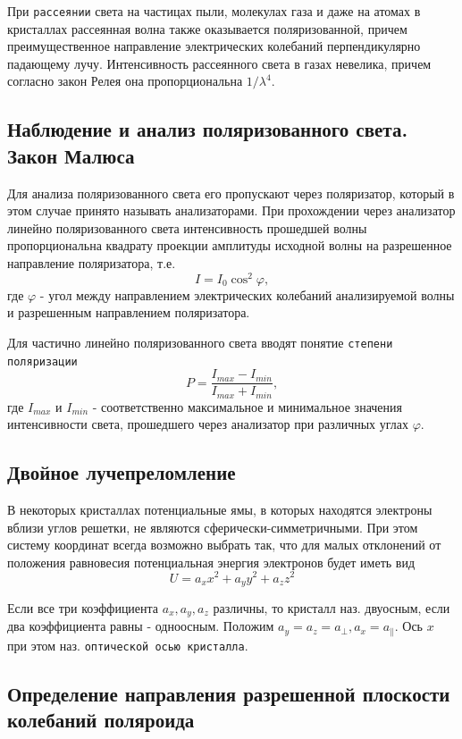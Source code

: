 \documentclass[a4paper,12pt]{article}
\begin{document}
При \texttt{рассеянии} света на частицах пыли, молекулах газа и даже на атомах в кристаллах рассеянная волна также оказывается поляризованной, причем преимущественное направление электрических колебаний перпендикулярно падающему лучу. Интенсивность рассеянного света в газах невелика, причем согласно закон Релея она пропорциональна $1/\lambda^4$.

\subsection{Наблюдение и анализ поляризованного света. Закон Малюса}

Для анализа поляризованного света его пропускают через поляризатор, который в этом случае принято называть анализаторами. При прохождении через анализатор линейно поляризованного света интенсивность прошедшей волны пропорциональна квадрату проекции амплитуды исходной волны на разрешенное направление поляризатора, т.е.
$$
I=I_0\cos^2{\varphi},
$$
где $\varphi$ - угол между направлением электрических колебаний анализируемой волны и разрешенным направлением поляризатора. 

Для частично линейно поляризованного света вводят понятие \texttt{степени поляризации}
$$
P=\frac{I_{max}-I_{min}}{I_{max}+I_{min}},
$$
где $I_{max}$ и $I_{min}$ - соответственно максимальное и минимальное значения интенсивности света, прошедшего через анализатор при различных углах $\varphi$.

\subsection{Двойное лучепреломление}

В некоторых кристаллах потенциальные ямы, в которых находятся электроны вблизи углов решетки, не являются сферически-симметричными. При этом систему координат всегда возможно выбрать так, что для малых отклонений от положения равновесия потенциальная энергия электронов будет иметь вид 
$$
U=a_xx^2+a_yy^2+a_zz^2
$$

Если все три коэффициента $a_x, a_y, a_z$ различны, то кристалл наз. двуосным, если два коэффициента равны - одноосным. Положим $a_y=a_z=a_\perp, a_x=a_\|$. Ось $x$ при этом наз. \texttt{оптической осью кристалла}. 

\subsection{Определение направления разрешенной плоскости колебаний поляроида}
\end{document}
